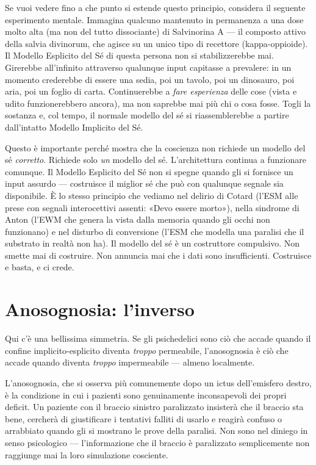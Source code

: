 \documentclass[11pt, twoside, openright]{book}
\begin{document}
Se vuoi vedere fino a che punto si estende questo principio, considera il seguente esperimento mentale. Immagina qualcuno mantenuto in permanenza a una dose molto alta (ma non del tutto dissociante) di Salvinorina A --- il composto attivo della salvia divinorum, che agisce su un unico tipo di recettore (kappa-oppioide). Il Modello Esplicito del Sé di questa persona non si stabilizzerebbe mai. Girerebbe all'infinito attraverso qualunque input capitasse a prevalere: in un momento crederebbe di essere una sedia, poi un tavolo, poi un dinosauro, poi aria, poi un foglio di carta. Continuerebbe a \textit{fare esperienza} delle cose (vista e udito funzionerebbero ancora), ma non saprebbe mai più chi o cosa fosse. Togli la sostanza e, col tempo, il normale modello del sé si riassemblerebbe a partire dall'intatto Modello Implicito del Sé.

Questo è importante perché mostra che la coscienza non richiede un modello del sé \textit{corretto}. Richiede solo \textit{un} modello del sé. L'architettura continua a funzionare comunque. Il Modello Esplicito del Sé non si spegne quando gli si fornisce un input assurdo --- costruisce il miglior sé che può con qualunque segnale sia disponibile. È lo stesso principio che vediamo nel delirio di Cotard (l'ESM alle prese con segnali interocettivi assenti: «Devo essere morto»), nella sindrome di Anton (l'EWM che genera la vista dalla memoria quando gli occhi non funzionano) e nel disturbo di conversione (l'ESM che modella una paralisi che il substrato in realtà non ha). Il modello del sé è un costruttore compulsivo. Non smette mai di costruire. Non annuncia mai che i dati sono insufficienti. Costruisce e basta, e ci crede.

\section*{Anosognosia: l'inverso}

Qui c'è una bellissima simmetria. Se gli psichedelici sono ciò che accade quando il confine implicito-esplicito diventa \textit{troppo} permeabile, l'anosognosia è ciò che accade quando diventa \textit{troppo} impermeabile --- almeno localmente.

L'anosognosia, che si osserva più comunemente dopo un ictus dell'emisfero destro, è la condizione in cui i pazienti sono genuinamente inconsapevoli dei propri deficit. Un paziente con il braccio sinistro paralizzato insisterà che il braccio sta bene, cercherà di giustificare i tentativi falliti di usarlo e reagirà confuso o arrabbiato quando gli si mostrano le prove della paralisi. Non sono nel diniego in senso psicologico --- l'informazione che il braccio è paralizzato semplicemente non raggiunge mai la loro simulazione cosciente.
\end{document}
